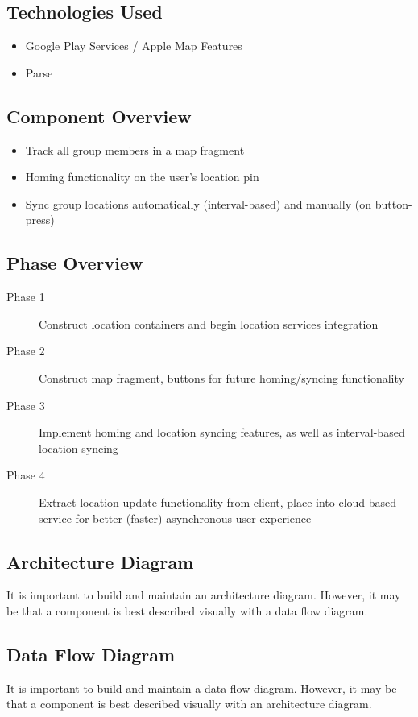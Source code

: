 \subsection{Technologies  Used}
\begin{itemize}
  \item Google Play Services / Apple Map Features
  \item Parse
\end{itemize}

\subsection{Component  Overview}
\begin{itemize}
  \item Track all group members in a map fragment
  \item Homing functionality on the user's location pin
  \item Sync group locations automatically (interval-based) and manually (on button-press)
\end{itemize}

\subsection{Phase Overview}
\begin{description}
  \item [Phase 1] Construct location containers and begin location services integration
  \item [Phase 2] Construct map fragment, buttons for future homing/syncing functionality
  \item [Phase 3] Implement homing and location syncing features, as well as interval-based location syncing
  \item [Phase 4] Extract location update functionality from client, place into cloud-based service for better (faster) asynchronous user experience
\end{description}

\subsection{ Architecture  Diagram}
It is important to build and maintain an architecture diagram.  However, it may 
be that a component is best described visually with a data flow diagram. 

\subsection{Data Flow Diagram}
It is important to build and maintain a data flow diagram.  However, it may be 
that a component is best described visually with an architecture diagram. 


